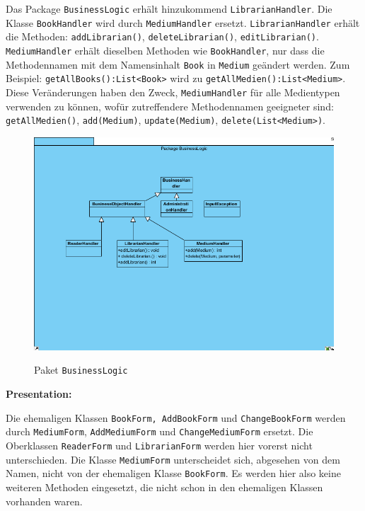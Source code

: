 \documentclass[fontsize=12pt,paper=a4,twoside]{scrartcl}
\begin{document}
Das Package \texttt{BusinessLogic} erhält hinzukommend \texttt{LibrarianHandler}. Die Klasse
\texttt{BookHandler} wird durch \texttt{MediumHandler} ersetzt.
\texttt{LibrarianHandler} erhält die Methoden:
\texttt{addLibrarian()},
\texttt{deleteLibrarian()},
\texttt{editLibrarian()}. \\
\texttt{MediumHandler} erhält dieselben Methoden wie \texttt{BookHandler}, nur dass die Methodennamen 
mit dem Namensinhalt \texttt{Book} in \texttt{Medium} geändert werden. Zum Beispiel:
\texttt{getAllBooks():List<Book>} wird zu  \texttt{getAllMedien():List<Medium>}. Diese Veränderungen haben den Zweck, \texttt{MediumHandler} für alle Medientypen verwenden zu können, wofür zutreffendere Methodennamen geeigneter sind:
\texttt{getAllMedien()},
\texttt{add(Medium)},
\texttt{update(Medium)},
\texttt{delete(List<Medium>)}.

\begin{figure} [H] 
\caption{Paket \texttt{BusinessLogic}} \centering
 \includegraphics[width=1\textwidth]{Diagramme/BusinessLogic.png} 
 \label{BusinessLogic} 
\end{figure}

\textbf{Presentation:}

Die ehemaligen Klassen \texttt{BookForm, AddBookForm} und \texttt{ChangeBookForm} werden durch \texttt{MediumForm}, \texttt{AddMediumForm} und \texttt{ChangeMediumForm} ersetzt. Die Oberklassen \texttt{ReaderForm} und \texttt{LibrarianForm} werden hier vorerst nicht unterschieden. Die Klasse \texttt{MediumForm} unterscheidet sich, abgesehen von dem Namen, nicht von der ehemaligen Klasse \texttt{BookForm}. Es werden hier also keine weiteren Methoden eingesetzt, die nicht schon in den ehemaligen Klassen vorhanden waren.
\end{document}
